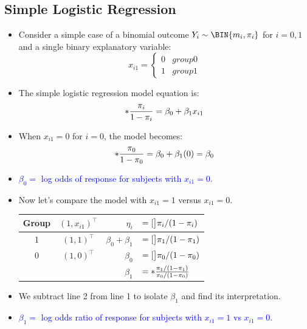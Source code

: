 \documentclass[oneside]{book}\usepackage[]{graphicx}\usepackage[svgnames]{xcolor}
\let\log\relax%
\begin{document}
\subsection*{Simple Logistic Regression}
\begin{itemize}
      \item Consider a simple case of a binomial outcome $ Y_i \sim \BIN{m_i,\pi_i} $ for $ i=0,1 $ and a single binary explanatory variable:
            \[ x_{i1}=\begin{cases*}
                        0 & group 0 \\
                        1 & group 1
                  \end{cases*} \]
      \item The simple logistic regression model equation is:
            \[ \log*{\frac{\pi_i}{1-\pi_i}}=\beta_0+\beta_1x_{i1} \]
      \item When $ x_{i1}=0 $ for $ i=0 $, the model becomes:
            \[ \log*{\frac{\pi_0}{1-\pi_0}}=\beta_0+\beta_1(0)=\beta_0 \]
      \item \textcolor{Blue}{$ \beta_0 = $ log odds of response for subjects with $ x_{i1}=0 $}.
      \item Now let's compare the model with $ x_{i1}=1 $ versus $ x_{i1}=0 $.
            \begin{table}[!htbp]
                  \centering
                  \begin{NiceTabular}{ccrl}
                        Group & $ (1,x_{i1})^\top $ & $ \eta_i $ & $ =\log[\big]{\pi_i/(1-\pi_i)} $\\
                         & $ (1,1)^\top $ & $ \beta_0+\beta_1 $ & $ =\log[\big]{\pi_1/(1-\pi_1)} $\\
                        0 & $ (1,0)^\top $ & $ \beta_0 $ & $ =\log[\big]{\pi_0/(1-\pi_0)} $\\
                        \midrule
                        &&$ \beta_1 $ & $ =\log*{\frac{\pi_1/(1-\pi_1)}{\pi_0/(1-\pi_0)}} $
                  \end{NiceTabular}
            \end{table}
      \item We subtract line 2 from line 1 to isolate $ \beta_1 $ and find its interpretation.
      \item \textcolor{Blue}{$ \beta_1= $ log odds ratio of response for subjects with $ x_{i1}=1 $ vs $ x_{i1}=0 $}.
\end{itemize}
\end{document}
